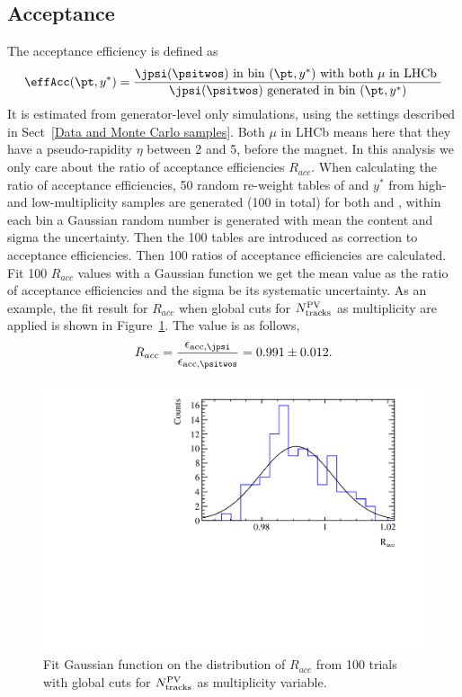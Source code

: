 \subsection{Acceptance}
The acceptance efficiency is defined as
\begin{equation}
    \effAcc(\pt,y^*)=\frac{\jpsi(\psitwos) \mathrm{ \ in \  bin \ } (\pt,y^*) \mathrm{ \ with  \ both \ } \mu \mathrm{ \ in \  LHCb \ }}{\jpsi(\psitwos) \mathrm{ \ generated \ in \ bin \ }(\pt,y^*)}
\end{equation}
 It is estimated from generator-level only simulations, using the settings described in Sect~\ref{Data and Monte Carlo samples}. Both $\mu$ in LHCb means here that they have a pseudo-rapidity $\eta$ between 2 and 5, before the magnet. In this analysis we only care about the ratio of acceptance efficiencies $R_{acc}$. When calculating the ratio of acceptance efficiencies, 50 random re-weight tables of \pt and $y^*$ from high- and low-multiplicity samples are generated (100 in total) for both \jpsi and \psitwos, within each bin a Gaussian random number is generated with mean the content and sigma the uncertainty. Then the 100 tables are introduced as correction to acceptance efficiencies. Then 100 ratios of acceptance efficiencies are calculated. Fit 100 $R_{acc}$ values with a Gaussian function we get the mean value as the ratio of acceptance efficiencies and the sigma be its systematic uncertainty. As an example, the fit result for $R_{acc}$ when global cuts for $N_{\rm tracks}^{\rm PV}$ as multiplicity are applied is shown in Figure~\ref{EffAccRatio}. The value is as follows,
\begin{equation}
	R_{acc}=\frac{\ensuremath{\epsilon_{\mathrm{acc,\jpsi}}}}{\ensuremath{\epsilon_{\mathrm{acc,\psitwos}}}}=0.991\pm 0.012.
\end{equation}
\begin{figure}[H]
\begin{center}
\includegraphics[width=0.5\linewidth]{pdf/pPb/Workdir/Eff_RecselPIDTrigger/Racc.pdf}
\end{center}
\caption{
	Fit Gaussian function on the distribution of $R_{acc}$ from 100 trials with global cuts for $N_{\rm tracks}^{\rm PV}$ as multiplicity variable.}
\label{EffAccRatio}
\end{figure}


